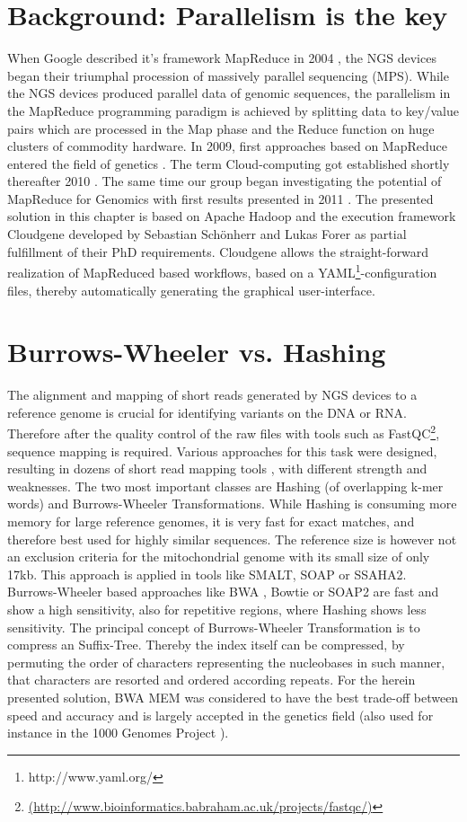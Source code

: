\section{Background: Parallelism is the key}
When Google described it's framework MapReduce in 2004 \cite{Dean2008}, the NGS devices began their triumphal procession of massively parallel sequencing (MPS). While the NGS devices produced parallel data of genomic sequences, the parallelism in the MapReduce programming paradigm is achieved by splitting data to key/value pairs which are processed in the Map phase and the Reduce function on huge clusters of commodity hardware. In 2009, first approaches based on MapReduce entered the field of genetics \cite{Schatz2009}. The term Cloud-computing got established shortly thereafter 2010 \cite{Schatz2010}. The same time our group began investigating the potential of MapReduce for Genomics with first results presented in 2011 \cite{DBLP:conf/gvd/SchonherrFWKSK11}. The presented solution in this chapter is based on Apache Hadoop and the execution framework Cloudgene \cite{Schonherr2012} developed by Sebastian Sch\"onherr and Lukas Forer as partial fulfillment of their PhD requirements. Cloudgene allows the straight-forward realization of MapReduced based workflows, based on a YAML\footnote{{http://www.yaml.org/}}-configuration files, thereby automatically generating the graphical user-interface. 

\section{Burrows-Wheeler vs. Hashing}
The alignment and mapping of short reads generated by NGS devices to a reference genome is crucial for identifying variants on the DNA or RNA. Therefore after the quality control of the raw files with tools such as FastQC\footnote{\url{(http://www.bioinformatics.babraham.ac.uk/projects/fastqc/)}}, sequence mapping is required. Various approaches for this task were designed, resulting in dozens of short read mapping tools  \cite{Hatem2013,Pabinger2013}, with different strength and weaknesses. The two most important classes are Hashing (of overlapping k-mer words) and Burrows-Wheeler Transformations. While Hashing is consuming more memory for large reference genomes, it is very fast for exact matches, and therefore best used for highly similar sequences. The reference size is however not an exclusion criteria for the mitochondrial genome with its small size of only 17kb. This approach is applied in tools like SMALT, SOAP or SSAHA2. Burrows-Wheeler based approaches like BWA \cite{Li2009}, Bowtie \cite{Langmead2009} or SOAP2 are fast and show a high sensitivity, also for repetitive regions, where Hashing shows less sensitivity. The principal concept of Burrows-Wheeler Transformation is to compress an Suffix-Tree. Thereby the index itself can be compressed, by permuting the order of characters representing the nucleobases in such manner, that characters are resorted and ordered according repeats. For the herein presented solution, BWA MEM \cite{Li2013a} was considered to have the best trade-off between speed and accuracy and is largely accepted in the genetics field (also used for instance in the 1000 Genomes Project \cite{Abecasis2012}).

